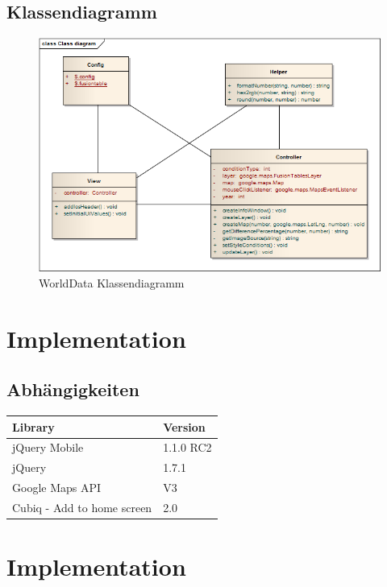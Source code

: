 \subsection{Klassendiagramm}
\begin{figure}[!h]
	\centering
	\includegraphics[scale=0.7]{images/usecase1-worlddata/worlddata-classdiagram.png}
	\caption{WorldData Klassendiagramm}
	\label{worlddata-classdiagram}
\end{figure}

\section{Implementation}
\subsection{Abhängigkeiten}
\begin{tabular}{|l|l|}
\hline 
Library & Version \\ 
\hline 
jQuery Mobile & 1.1.0 RC2 \\ 
\hline 
jQuery & 1.7.1 \\ 
\hline 
Google Maps API & V3 \\ 
\hline 
Cubiq - Add to home screen & 2.0 \\ 
\hline 
\end{tabular} 

\section{Implementation}
